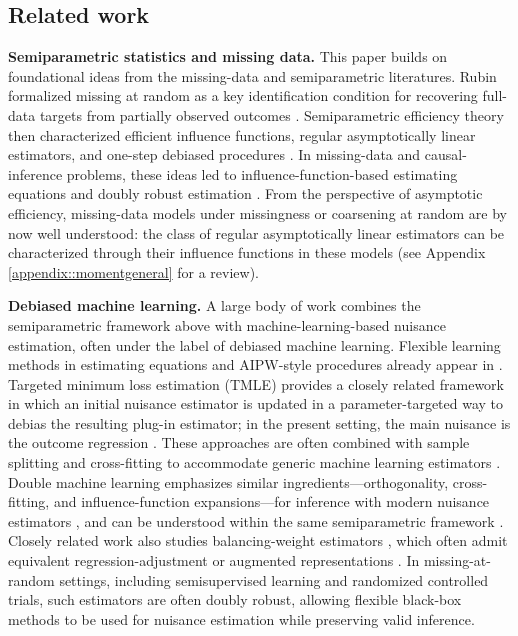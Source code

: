 \documentclass{article}
\theoremstyle{plain}
\theoremstyle{definition}
\newcommand{\1}{\mathbbm{1}}
\begin{document}
 


\subsection{Related work}
\textbf{Semiparametric statistics and missing data.} This paper builds on foundational ideas from the missing-data and semiparametric literatures. Rubin formalized missing at random as a key identification condition for recovering full-data targets from partially observed outcomes \citep{rubin1976}. Semiparametric efficiency theory then characterized efficient influence functions, regular asymptotically linear estimators, and one-step debiased procedures \citep{levit1975efficiency,pfanzagl1985contributions,hasminskii1979nonparametric,bickel1993efficient}. In missing-data and causal-inference problems, these ideas led to influence-function-based estimating equations \citep{robinsCausal,robins1995analysis,vanderlaanunified,tsiatis2006semiparametric} and doubly robust estimation \citep{bang2005doubly}. From the perspective of asymptotic efficiency, missing-data models under missingness or coarsening at random are by now well understood: the class of regular asymptotically linear estimators can be characterized through their influence functions in these models \citep{robinsCausal,robins1995analysis,vanderlaanunified} (see Appendix \ref{appendix::momentgeneral} for a review).  

 
 
\textbf{Debiased machine learning.} A large body of work combines the semiparametric framework above with machine-learning-based nuisance estimation, often under the label of debiased machine learning. Flexible learning methods in estimating equations and AIPW-style procedures already appear in \cite{vanderlaanunified}. Targeted minimum loss estimation (TMLE) \citep{van2006targeted,vanderLaanRose2011} provides a closely related framework in which an initial nuisance estimator is updated in a parameter-targeted way to debias the resulting plug-in estimator; in the present setting, the main nuisance is the outcome regression \citep{gruber2009targeted,hoffman2020tmle,ross2025constructing}. These approaches are often combined with sample splitting and cross-fitting to accommodate generic machine learning estimators \citep{schick1986asymptotically,zheng2010asymptotic,vanderLaanRose2011,DoubleML}. Double machine learning emphasizes similar ingredients---orthogonality, cross-fitting, and influence-function expansions---for inference with modern nuisance estimators \citep{DoubleML,chernozhukov2022automatic}, and can be understood within the same semiparametric framework \citep{vanderlaan2019cvtmle,diaz2020machine,chen2026equivalence}. Closely related work also studies balancing-weight estimators \citep{hainmueller2012entropy,imai2014covariate,zubizarreta2015stable,lendle2015balancing,chattopadhyay2020balancing,hejazi2023revisiting}, which often admit equivalent regression-adjustment or augmented representations \citep{chattopadhyay2023implied,bruns2025augmented}. In missing-at-random settings, including semisupervised learning and randomized controlled trials, such estimators are often doubly robust, allowing flexible black-box methods to be used for nuisance estimation while preserving valid inference.
\end{document}
